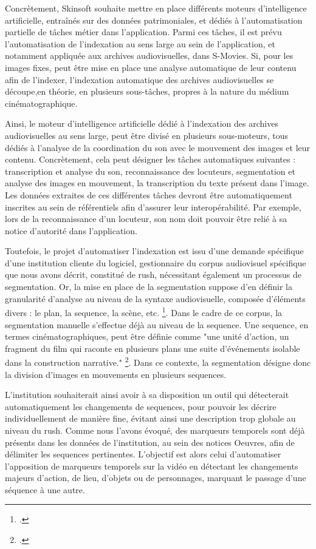 Concrètement, Skinsoft souhaite mettre en place différents moteurs d'intelligence artificielle, entraînés sur des données patrimoniales, et dédiés à l'automatisation partielle de tâches métier dans l'application. Parmi ces tâches, il est prévu l'automatisation de l'indexation au sens large au sein de l'application, et notamment appliquée aux archives audiovisuelles, dans S-Movies. Si, pour les images fixes, peut être mise en place une analyse automatique de leur contenu afin de l'indexer, l'indexation automatique des archives audiovisuelles se découpe,en théorie, en plusieurs sous-tâches, propres à la nature du médium cinématographique.  

Ainsi, le moteur d'intelligence artificielle dédié à l'indexation des archives audiovisuelles au sens large, peut être divisé en plusieurs sous-moteurs, tous dédiés à l'analyse de la coordination du son avec le mouvement des images et leur contenu. Concrètement, cela peut désigner les tâches automatiques suivantes : transcription et analyse du son, reconnaissance des locuteurs, segmentation et analyse des images en mouvement, la transcription du texte présent dans l'image. Les données extraites de ces différentes tâches devront être automatiquement inscrites au sein de référentiels afin d'assurer leur interopérabilité. Par exemple, lors de la reconnaissance d'un locuteur, son nom doit pouvoir être relié à sa notice d'autorité dans l'application.  

Toutefois, le projet d'automatiser l'indexation est issu d'une demande spécifique d'une institution cliente du logiciel, gestionnaire du corpus audiovisuel spécifique que nous avons décrit, constitué de \gls{rush}, nécessitant également un processus de segmentation. Or, la mise en place de la segmentation suppose d’en définir la granularité d'analyse au niveau de la syntaxe audiovisuelle, composée d'éléments divers : le \gls{plan}, la \gls{sequence}, la scène, etc. \footcite{stockinger2011}. Dans le cadre de ce corpus, la segmentation manuelle s'effectue déjà au niveau de la \gls{sequence}. Une \gls{sequence}, en termes cinématographiques, peut être définie comme "une unité d'action, un fragment du film qui raconte en plusieurs plans une suite d'événements isolable dans la construction narrative." \footcite{journot2008}. Dans ce contexte, la segmentation désigne donc la division d'images en mouvements en plusieurs \gls{sequence}s. 

L'institution souhaiterait ainsi avoir à sa disposition un outil qui détecterait automatiquement les changements de \gls{sequence}s, pour pouvoir les décrire individuellement de manière fine, évitant ainsi une description trop globale au niveau du \gls{rush}. Comme nous l'avons évoqué, des marqueurs temporels sont déjà présents dans les données de l'institution, au sein des notices Oeuvres, afin de délimiter les \gls{sequence}s pertinentes. L'objectif est alors celui d'automatiser l'apposition de marqueurs temporels sur la vidéo en détectant les changements majeurs d'action, de lieu, d'objets ou de personnages, marquant le passage d'une séquence à une autre. 

